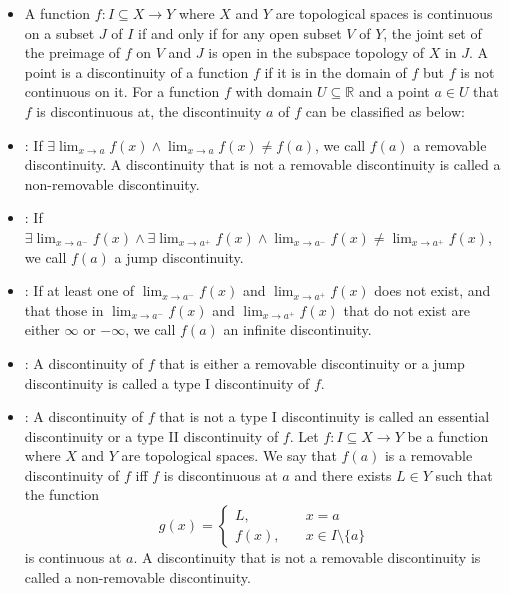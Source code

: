 \documentclass[a4paper,12pt]{report}
\begin{document}
\begin{itemize}
\begin{itemize}
\item A function $f\colon I\subseteq X\to Y$ where $X$ and $Y$ are topological spaces is continuous on a subset $J$ of $I$ if and only if for any open subset $V$ of $Y$, the joint set of the preimage of $f$ on $V$ and $J$ is open in the subspace topology of $X$ in $J$.
\eit
{}
A point is a discontinuity of a function $f$ if it is in the domain of $f$ but $f$ is not continuous on it.
For a function $f$ with domain $U\subseteq\mathbb{R}$ and a point $a\in U$ that $f$ is discontinuous at, the discontinuity $a$ of $f$ can be classified as below:
\bit
\item {}: If $\exists\lim_{x\to a}f(x)\land\lim_{x\to a}f(x)\neq f(a)$, we call $f(a)$ a removable discontinuity. A discontinuity that is not a removable discontinuity is called a non-removable discontinuity.
\item {}: If $\exists\lim_{x\to a^-}f(x)\land\exists\lim_{x\to a^+}f(x)\land\lim_{x\to a^-}f(x)\neq\lim_{x\to a^+}f(x)$, we call $f(a)$ a jump discontinuity.
\item{}: If at least one of $\lim_{x\to a^-}f(x)$ and $\lim_{x\to a^+}f(x)$ does not exist, and that those in $\lim_{x\to a^-}f(x)$ and $\lim_{x\to a^+}f(x)$ that do not exist are either $\infty$ or $-\infty$, we call $f(a)$ an infinite discontinuity.
\item{}: A discontinuity of $f$ that is either a removable discontinuity or a jump discontinuity is called a type I discontinuity of $f$.
\item{}: A discontinuity of $f$ that is not a type I discontinuity is called an essential discontinuity or a type II discontinuity of $f$.
\eit
{}
Let $f\colon I\subseteq X\to Y$ be a function where $X$ and $Y$ are topological spaces. We say that $f(a)$ is a removable discontinuity of $f$ iff $f$ is discontinuous at $a$ and there exists $L\in Y$ such that the function
\[g(x)=\begin{cases}L,\quad&x=a\\f(x),\quad&x\in I\setminus\{a\}\end{cases}\]
is continuous at $a$. A discontinuity that is not a removable discontinuity is called a non-removable discontinuity.

\end{itemize}
\end{itemize}
\end{document}

